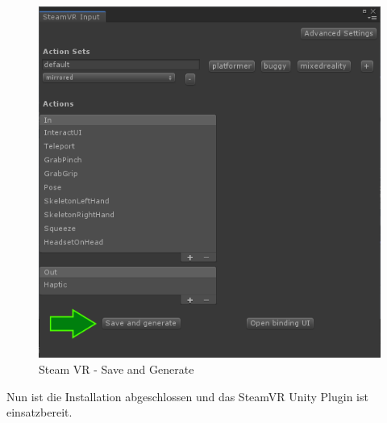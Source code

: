 \begin{itemize}
\begin {figure}
    \centering
    \includegraphics[scale=0.6]{pics/steamVR-Input-SaveAndGenerate}
    \caption{Steam VR - Save and Generate}
    \label{fig:steamvr_save_and_generate}
\end {figure}
Nun ist die Installation abgeschlossen und das SteamVR Unity Plugin ist einsatzbereit.
~\cite{SteamVR_Quickstart_2022}


\end{itemize}
